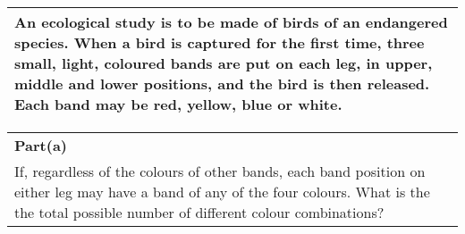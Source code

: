 \documentclass[a4paper,12pt]{article}
\begin{document}
\begin{table}[ht!]
     \centering
     \begin{tabular}{|p{15cm}|}
     \hline        
\noindent An ecological study is to be made of birds of an endangered species. When a bird is captured for the first time, three small, light, coloured bands are put on each leg, in upper, middle and lower positions, and the bird is then released.  Each band may be red, yellow, blue or white. 
\\ \hline
      \end{tabular}
    \end{table}
    
  \begin{table}[ht!]
     \centering
     \begin{tabular}{|p{15cm}|}
     \hline  
\noindent \textbf{Part(a)}\\
If, regardless of the colours of other bands, each band position on either leg may have a band of any of the four colours. What is the the total possible number of different colour combinations?     
 \\ \hline 
      \end{tabular}
    \end{table}

\bigskip
\end{document}
